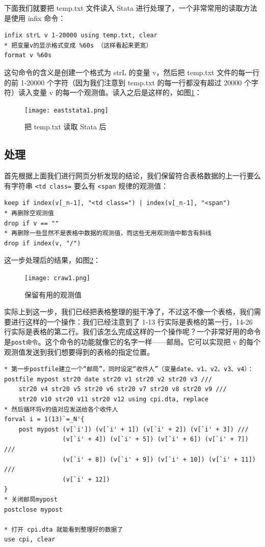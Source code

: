\documentclass[cn,fancy,blue,11pt]{elegantbook}
\begin{document}
下面我们就要把 temp.txt 文件读入 Stata 进行处理了，一个非常常用的读取方法是使用 infix 命令：

\begin{lstlisting}
infix strL v 1-20000 using temp.txt, clear
* 把变量v的显示格式变成 %60s （这样看起来更宽）
format v %60s
\end{lstlisting}

这句命令的含义是创建一个格式为 strL 的变量 v，然后把 temp.txt 文件的每一行的前 1-20000 个字符（因为我们注意到 temp.txt 的每一行都没有超过 20000 个字符）读入变量 v 的每一个观测值。读入之后是这样的，如图\ref{fig:eaststata1}：

\begin{figure}
  \centering
  \texttt{[image: eaststata1.png]}
  \caption{把 temp.txt 读取 Stata 后}
  \label{fig:eaststata1}
\end{figure}

\hypertarget{section-35}{%
\subsection{处理}\label{section-35}}

首先根据上面我们进行网页分析发现的结论，我们保留符合表格数据的上一行要么有字符串 \lstinline{<td class=} 要么有 \lstinline{<span} 规律的观测值：

\begin{lstlisting}
keep if index(v[_n-1], "<td class=") | index(v[_n-1], "<span")
* 再删除空观测值
drop if v == ""
* 再删除一些显然不是表格中数据的观测值，而这些无用观测值中都含有斜线
drop if index(v, "/")
\end{lstlisting}

这一步处理后的结果，如图\ref{fig:craw1}：

\begin{figure}
  \centering
  \texttt{[image: craw1.png]}
  \caption{保留有用的观测值}
  \label{fig:craw1}
\end{figure}

实际上到这一步，我们已经把表格整理的挺干净了，不过这不像一个表格，我们需要进行这样的一个操作：我们已经注意到了 1-13 行实际是表格的第一行，14-26 行实际是表格的第二行。我们该怎么完成这样的一个操作呢？一个非常好用的命令是\lstinline{post命令}。这个命令的功能就像它的名字一样------邮局。它可以实现把 v 的每个观测值发送到我们想要得到的表格的指定位置。

\begin{lstlisting}
* 第一步postfile建立一个“邮局”，同时设定“收件人”（变量date、v1、v2、v3、v4）：
postfile mypost str20 date str20 v1 str20 v2 str20 v3 ///
    str20 v4 str20 v5 str20 v6 str20 v7 str20 v8 str20 v9 ///
    str20 v10 str20 v11 str20 v12 using cpi.dta, replace
* 然后循环将v的值对应发送给各个收件人
forval i = 1(13)`=_N'{
    post mypost (v[`i']) (v[`i' + 1]) (v[`i' + 2]) (v[`i' + 3]) ///
                (v[`i' + 4]) (v[`i' + 5]) (v[`i' + 6]) (v[`i' + 7]) ///
                (v[`i' + 8]) (v[`i' + 9]) (v[`i' + 10]) (v[`i' + 11]) ///
                (v[`i' + 12])
}
* 关闭邮局mypost
postclose mypost

* 打开 cpi.dta 就能看到整理好的数据了
use cpi, clear
\end{lstlisting}
\end{document}
